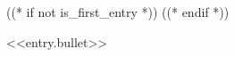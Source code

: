 ((* if not is_first_entry *))
\vspace{<<design.margins.entry_area.vertical_between>>}
((* endif *))

\begin{onecolentry}
    \textbullet \hspace{3pt} <<entry.bullet>>
\end{onecolentry}
